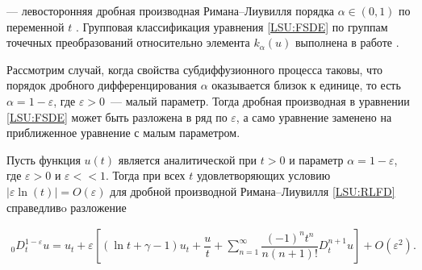 --- левосторонняя дробная производная Римана--Лиувилля порядка $\alpha \in (0,1)$ по переменной $t$ \cite{LSU:SKM, LSU:KST}. Групповая классификация уравнения \eqref{LSU:FSDE} по группам точечных преобразований относительно элемента $k_{\alpha}(u)$ выполнена в работе \cite{LSU:GKL_PS_09}.



Рассмотрим случай, когда свойства субдиффузионного процесса таковы, что порядок дробного дифференцирования $\alpha$ оказывается близок к единице, то есть $\alpha=1-\varepsilon$, где $\varepsilon>0$~--- малый параметр. Тогда дробная производная в уравнении \eqref{LSU:FSDE} может быть разложена в ряд по $\varepsilon$, а само уравнение заменено на приближенное уравнение с малым параметром.



\begin{lemma} Пусть функция $u(t)$ является аналитической при $t>0$ и параметр $\alpha=1-\varepsilon$, где $\varepsilon>0$ и $\varepsilon<<1$. Тогда при всех $t$ удовлетворяющих условию $|\varepsilon \ln(t)|=O(\varepsilon)$ для дробной производной Римана--Лиувилля \eqref{LSU:RLFD} справедливo разложение 

\begin{multline} 

\label{LSU:ARLFD} 

{}^{}_{0}D^{1-\varepsilon}_t u = u_t+\varepsilon \left[(\ln t + \gamma-1)u_t + \dfrac{u}{t} + \sum_{n=1}^{\infty} \dfrac{(-1)^n t^n}{n(n+1)!} D^{n+1}_t u \right]+O(\varepsilon^2). 

\end{multline} 

\end{lemma}



